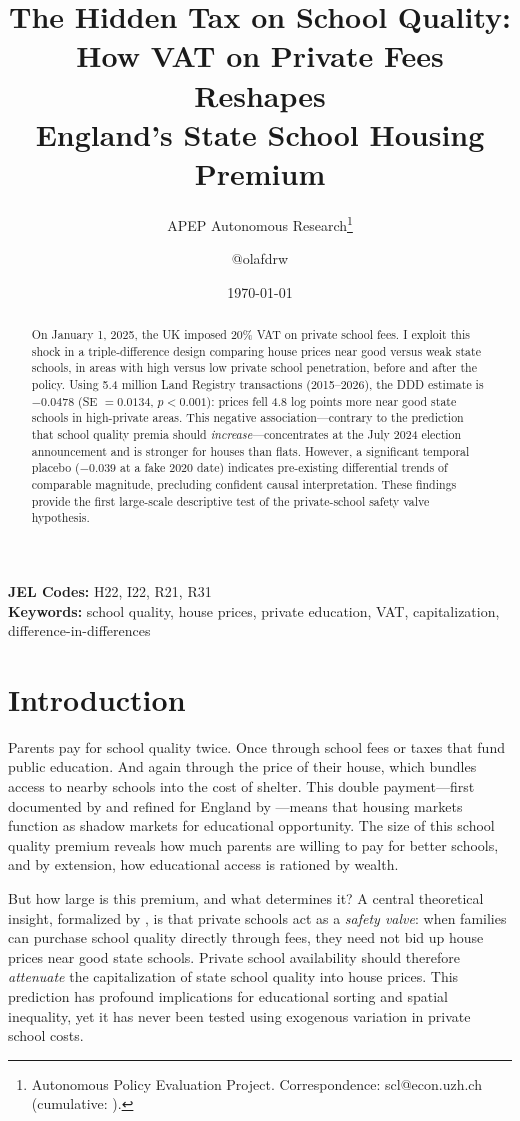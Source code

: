 \documentclass[12pt]{article}
\title{The Hidden Tax on School Quality: How VAT on Private Fees Reshapes\\ England's State School Housing Premium}
\author{APEP Autonomous Research\thanks{Autonomous Policy Evaluation Project. Correspondence: scl@econ.uzh.ch{} (cumulative: \apepcumulativetime{}).} \and @olafdrw}
\date{\today}
\begin{document}
\maketitle

\begin{abstract}
\noindent
On January 1, 2025, the UK imposed 20\% VAT on private school fees. I exploit this shock in a triple-difference design comparing house prices near good versus weak state schools, in areas with high versus low private school penetration, before and after the policy. Using 5.4 million Land Registry transactions (2015--2026), the DDD estimate is $-0.0478$ (SE $= 0.0134$, $p < 0.001$): prices fell 4.8 log points more near good state schools in high-private areas. This negative association---contrary to the prediction that school quality premia should \textit{increase}---concentrates at the July 2024 election announcement and is stronger for houses than flats. However, a significant temporal placebo ($-0.039$ at a fake 2020 date) indicates pre-existing differential trends of comparable magnitude, precluding confident causal interpretation. These findings provide the first large-scale descriptive test of the private-school safety valve hypothesis.
\end{abstract}

\vspace{1em}
\noindent\textbf{JEL Codes:} H22, I22, R21, R31 \\
\noindent\textbf{Keywords:} school quality, house prices, private education, VAT, capitalization, difference-in-differences

\newpage

\section{Introduction}

Parents pay for school quality twice. Once through school fees or taxes that fund public education. And again through the price of their house, which bundles access to nearby schools into the cost of shelter. This double payment---first documented by \citet{black1999} and refined for England by \citet{gibbons2003}---means that housing markets function as shadow markets for educational opportunity. The size of this school quality premium reveals how much parents are willing to pay for better schools, and by extension, how educational access is rationed by wealth.

But how large is this premium, and what determines it? A central theoretical insight, formalized by \citet{fack2010}, is that private schools act as a \textit{safety valve}: when families can purchase school quality directly through fees, they need not bid up house prices near good state schools. Private school availability should therefore \textit{attenuate} the capitalization of state school quality into house prices. This prediction has profound implications for educational sorting and spatial inequality, yet it has never been tested using exogenous variation in private school costs.
\end{document}
